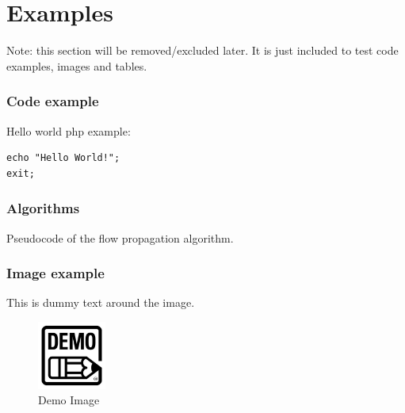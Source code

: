 \documentclass[main.tex]{subfiles}
\begin{document}
    \chapter{Examples}\label{chap:examples}
    Note: this section will be removed/excluded later. 
    It is just included to test code examples, images and tables.
    
    \subsection{Code example}
    Hello world php example:
    \begin{lstlisting}
echo "Hello World!";
exit;
\end{lstlisting}
    
    

    
    \subsection{Algorithms}
    
\IncMargin{1em}
\begin{algorithm}[H]

\caption{Pseudocode of the flow propagation algorithm.}\label{algo_flowpropagation}
\end{algorithm}
\DecMargin{1em}

    \subsection{Image example}
    
    This is dummy text around the image.
    \begin{figure}[H]
        \includegraphics[width=0.2\textwidth]{img/demo.jpg}
        \caption{Demo Image}
        \label{fig:demo_image}
    \end{figure}
\end{document}
